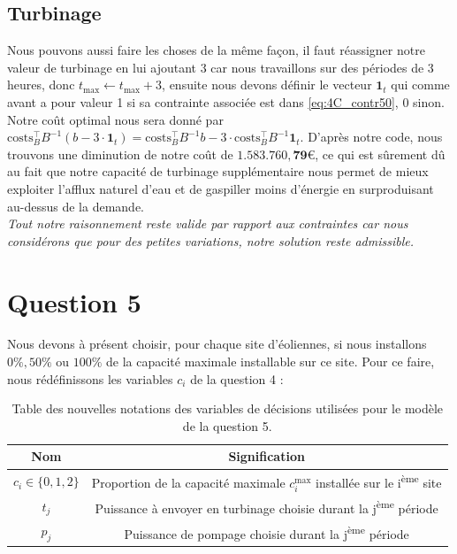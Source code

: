 \documentclass{article}
\begin{document}
\subsection*{Turbinage}
Nous pouvons aussi faire les choses de la même façon, il faut réassigner notre valeur de turbinage en lui ajoutant 3 car nous travaillons
sur des périodes de 3 heures, donc $t_\mathrm{max} \leftarrow t_\mathrm{max} + 3$, ensuite nous devons définir le vecteur $\mathbf{1}_{t}$ qui comme avant 
a pour valeur 1 si sa contrainte associée est dans \eqref{eq:4C_contr50}, 0 sinon. Notre coût optimal nous sera donné par 
$\mathrm{costs}^\intercal_{B} B^{-1} \left( b - 3 \cdot \mathbf{1}_{t} \right) 
= \mathrm{costs}^\intercal_{B} B^{-1} b - 3 \cdot \mathrm{costs}^\intercal_{B} B^{-1} \mathbf{1}_{t}  $. D'après notre code, nous trouvons une diminution
de notre coût de $\mathbf{1.583.760,79}$\euro, ce qui est sûrement dû au fait que notre capacité de turbinage supplémentaire nous permet de mieux
exploiter l'afflux naturel d'eau et de gaspiller moins d'énergie en surproduisant au-dessus de la demande. \\

\noindent \textit{Tout notre raisonnement reste valide par rapport aux contraintes car nous considérons que pour des petites variations, notre solution reste admissible.}

\newpage
\section*{Question 5}
Nous devons à présent choisir, pour chaque site d'éoliennes, si nous installons $0\%, 50\%$ ou $100\%$ de la capacité maximale installable sur ce site.
Pour ce faire, nous rédéfinissons les variables $c_i$ de la question 4 :

\begin{table}[h!]
    \centering
    \renewcommand{\arraystretch}{1.5}%
    \begin{tabular}{|c || c |} 
        \hline
        Nom & Signification\\
        \hline\hline
        $c_{i} \in \{ 0, 1, 2 \}$ & Proportion de la capacité maximale $c_i^\mathrm{max}$ installée sur le i\textsuperscript{ème} site\\
        $t_j$ & Puissance à envoyer en turbinage choisie durant la j\textsuperscript{ème} période\\
        $p_j$ & Puissance de pompage choisie durant la j\textsuperscript{ème} période\\
        \hline
    \end{tabular}
    \caption{Table des nouvelles notations des variables de décisions utilisées pour le modèle de la question 5.}
    \label{table:notations_variables_5}
\end{table} 
\end{document}
